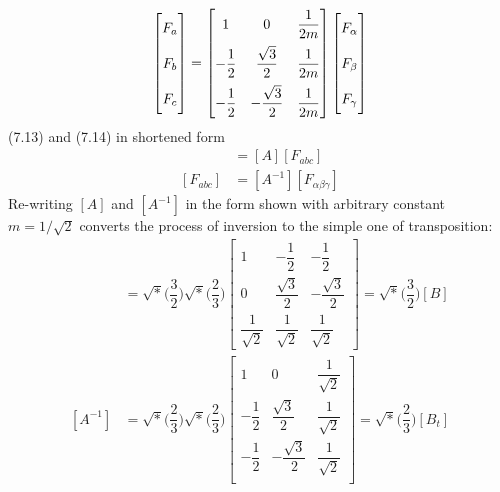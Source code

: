 \documentclass[a4paper,numbers=noenddot,12pt]{scrbook}
\begin{document}
    \begin{equation}
        \begin{bmatrix}
            F_a \vphantom{\dfrac{1}{2}} \\[2ex]
            F_b \vphantom{\dfrac{1}{2}} \\[2ex]
            F_c \vphantom{\dfrac{1}{2}} \\
        \end{bmatrix}
        =
        \begin{bmatrix}
            1  & 0 & \dfrac{1}{2m} \\[2ex]
            - \dfrac{1}{2} & \dfrac{\sqrt{3}}{2} & \dfrac{1}{2m} \\[2ex]
            - \dfrac{1}{2} & - \dfrac{\sqrt{3}}{2} & \dfrac{1}{2m}
        \end{bmatrix}
        \begin{bmatrix}
            F_{\alpha} \vphantom{\dfrac{1}{2}} \\[2ex]
            F_{\beta} \vphantom{\dfrac{1}{2}} \\[2ex]
            F_{\gamma} \vphantom{\dfrac{1}{2}} 
        \end{bmatrix}
        \label{eq:Eq7.14}
    \end{equation}
    (7.13) and (7.14) in shortened form
    \begin{align}
        [F_{\alpha \beta \gamma}] & =  [A][F_{abc}]\\
        [F_{abc}] & = [A^{-1}] [F_{\alpha \beta \gamma}]
        \label{eq:Eq7.16}
    \end{align}
    Re-writing $[A]$ and $[A^{-1}]$ in the form shown with arbitrary constant $m = 1/ \sqrt{2}$ converts the process of inversion to the simple one of transposition:
    \begin{align}
        [A] & = \sqrt*{\Big(\dfrac{3}{2}\Big)} \sqrt*{\Big(\dfrac{2}{3}\Big)}
        \begin{bmatrix}
            1  & - \dfrac{1}{2} & - \dfrac{1}{2} \\[2ex]
            0 & \dfrac{\sqrt{3}}{2} & - \dfrac{\sqrt{3}}{2} \\[2ex]
            \dfrac{1}{\sqrt{2}} & \dfrac{1}{\sqrt{2}} & \dfrac{1}{\sqrt{2}}
        \end{bmatrix}
        =
        \sqrt*{\Big(\dfrac{3}{2}\Big)}[B] \\
        [A^{-1}] & = \sqrt*{\Big(\dfrac{2}{3}\Big)} \sqrt*{\Big(\dfrac{2}{3}\Big)}
        \begin{bmatrix}
            1 & 0 & \dfrac{1}{\sqrt{2}} \\[2ex]
            - \dfrac{1}{2} & \dfrac{\sqrt{3}}{2} & \dfrac{1}{\sqrt{2}} \\[2ex]
            - \dfrac{1}{2} & - \dfrac{\sqrt{3}}{2} & \dfrac{1}{\sqrt{2}}\\
        \end{bmatrix}
        =
        \sqrt*{\Big(\dfrac{2}{3}\Big)}[B_t] 
        \label{eq:Eq7.18}
    \end{align}
\end{document}
